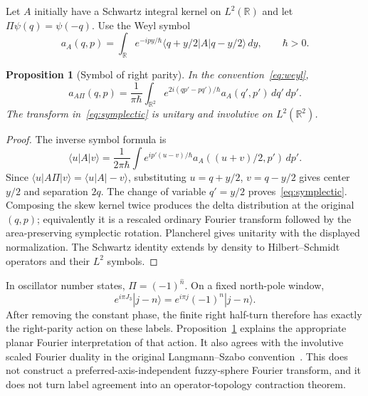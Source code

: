 \documentclass[11pt,a4paper]{article}
\newtheorem{proposition}[theorem]{Proposition}
\theoremstyle{remark}\newtheorem{remark}[theorem]{Remark}
\begin{document}
Let $A$ initially have a Schwartz integral kernel on $L^2(\mathbb R)$ and let $\Pi\psi(q)=\psi(-q)$.
Use the Weyl symbol
\begin{equation}\label{eq:weyl}
 a_A(q,p)=\int_{\mathbb R}e^{-ipy/\hbar}
 \langle q+y/2|A|q-y/2\rangle\,dy,\qquad\hbar>0.
\end{equation}
\begin{proposition}[Symbol of right parity]\label{prop:weyl}
In the convention~\eqref{eq:weyl},
\begin{equation}\label{eq:symplectic}
 a_{A\Pi}(q,p)=\frac1{\pi\hbar}\int_{\mathbb R^2}
 e^{2i(qp'-pq')/\hbar}a_A(q',p')\,dq'\,dp'.
\end{equation}
The transform in~\eqref{eq:symplectic} is unitary and involutive on $L^2(\mathbb R^2)$.
\end{proposition}
\begin{proof}
The inverse symbol formula is
\begin{equation}
 \langle u|A|v\rangle=\frac1{2\pi\hbar}
 \int e^{ip'(u-v)/\hbar}a_A((u+v)/2,p')\,dp'.
\end{equation}
Since $\langle u|A\Pi|v\rangle=\langle u|A|-v\rangle$, substituting $u=q+y/2$, $v=q-y/2$ gives center $y/2$ and separation $2q$.
The change of variable $q'=y/2$ proves~\eqref{eq:symplectic}.
Composing the skew kernel twice produces the delta distribution at the original $(q,p)$; equivalently it is a rescaled ordinary Fourier transform followed by the area-preserving symplectic rotation.
Plancherel gives unitarity with the displayed normalization.
The Schwartz identity extends by density to Hilbert--Schmidt operators and their $L^2$ symbols.
\end{proof}

In oscillator number states, $\Pi=(-1)^{\hat n}$.
On a fixed north-pole window,
\begin{equation}
 e^{i\pi J_3}|j-n\rangle=e^{i\pi j}(-1)^n|j-n\rangle.
\end{equation}
After removing the constant phase, the finite right half-turn therefore has exactly the right-parity action on these labels.
Proposition~\ref{prop:weyl} explains the appropriate planar Fourier interpretation of that action.
It also agrees with the involutive scaled Fourier duality in the original Langmann--Szabo convention~\citep[Prop.~1]{LangmannSzabo2002}.
This does not construct a preferred-axis-independent fuzzy-sphere Fourier transform, and it does not turn label agreement into an operator-topology contraction theorem.
\end{document}
